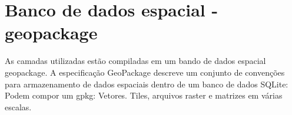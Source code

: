 \documentclass[
  letterpaper,
]{report}
\newlength{\cslhangindent}
\newlength{\cslentryspacingunit} %
\newenvironment{CSLReferences}[2] %
 {%
  \setlength{\parindent}{0pt}
  \ifodd #1
  \let\oldpar\par
  \def\par{\hangindent=\cslhangindent\oldpar}
  \fi
  \setlength{\parskip}{#2\cslentryspacingunit}
 }%
 {}
\begin{document}

\hypertarget{refs}{}
\begin{CSLReferences}{0}{0}
\end{CSLReferences}

\hypertarget{banco-de-dados-espacial---geopackage}{%
\section*{Banco de dados espacial -
geopackage}\label{banco-de-dados-espacial---geopackage}}


As camadas utilizadas estão compiladas em um bando de dados espacial
geopackage. A especificação GeoPackage descreve um conjunto de
convenções para armazenamento de dados espaciais dentro de um banco de
dados SQLite: Podem compor um gpkg: Vetores. Tiles, arquivos raster e
matrizes em várias escalas.
\end{document}
